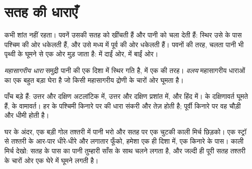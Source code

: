 \section{सतह की धाराएँ}

 कभी शांत नहीं रहता। पवनें उसकी सतह को खींचती हैं और पानी को चला देती हैं: स्थिर
 उसे  के पास पश्चिम की ओर धकेलती हैं, और  उसे मध्य
 में पूर्व की ओर धकेलती हैं। पवनों की तरह, चलता पानी भी पृथ्वी के घूमने से एक
ओर मुड़ जाता है:  में दाईं ओर,  में बाईं
ओर।

\begin{definition}[महासागरीय धारा और वलय]\label{def:g8:the-oceans:current}
\emph{महासागरीय धारा} समुद्री पानी की एक दिशा में स्थिर गति
है,  में एक  की तरह। \emph{वलय} महासागरीय धाराओं का
एक बहुत बड़ा घेरा है जो किसी महासागरीय द्रोणी के चारों ओर घूमता
है।
\end{definition}
\label{def:g8:the-oceans:gyre}

पाँच बड़े  हैं: उत्तर और दक्षिण अटलांटिक में, उत्तर और दक्षिण प्रशांत में, और हिंद
 में।  के  दक्षिणावर्त घूमते हैं,  के वामावर्त।
हर  के पश्चिमी किनारे पर  की धारा संकरी और तेज़ होती है; पूर्वी किनारे पर
वह चौड़ी और धीमी होती
है।

\begin{inthelab}[तश्तरी में एक वलय]
घर के अंदर, एक बड़ी गोल तश्तरी में पानी भरो और सतह पर एक चुटकी काली मिर्च छिड़को।
एक स्ट्रॉ से तश्तरी के आर-पार धीरे-धीरे और लगातार फूँको, हमेशा एक ही दिशा में, एक
किनारे के पास। काली मिर्च देखो: सतह के पास का पानी तुम्हारी साँस के साथ चलने लगता है,
और जल्दी ही पूरी सतह तश्तरी के चारों ओर एक घेरे में घूमने लगती
है।
\end{inthelab}

